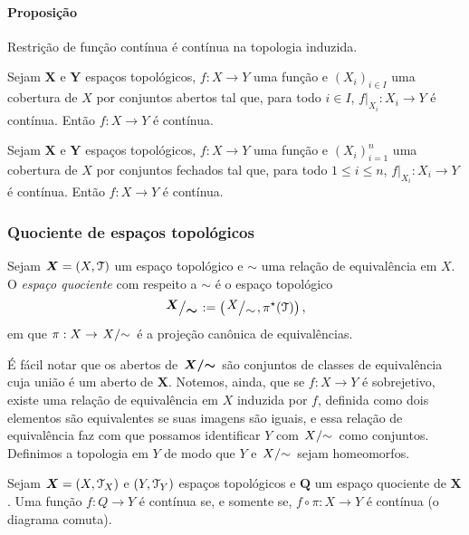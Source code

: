 \paragraph*{Proposição} Restrição de função contínua é contínua na topologia induzida.

\begin{proposition}
Sejam $\bm X$ e $\bm Y$ espaços topológicos, $f: X \to Y$ uma função e $(X_i)_{i \in I}$ uma cobertura de $X$ por conjuntos abertos tal que, para todo $i \in I$, $f|_{X_i}: X_i \to Y$ é contínua. Então $f: X \to Y$ é contínua.
\end{proposition}

\begin{proposition}
Sejam $\bm X$ e $\bm Y$ espaços topológicos, $f: X \to Y$ uma função e $(X_i)_{i=1}^n$ uma cobertura de $X$ por conjuntos fechados tal que, para todo $1 \leq i \leq n$, $f|_{X_i}: X_i \to Y$ é contínua. Então $f: X \to Y$ é contínua.
\end{proposition}

\subsubsection{Quociente de espaços topológicos}

\begin{definition}
Sejam $\bm X = (X,\mathcal{T})$ um espaço topológico e $\sim$ uma relação de equivalência em $X$. O \emph{espaço quociente} com respeito a $\sim$ é o espaço topológico
	\begin{equation*}
	\bm{\quo{X}{\sim}} := \left( \quo{X}{\sim}, \pi^\star(\topo) \right),
	\end{equation*}
em que $\pi: X \to \quo{X}{\sim}$ é a projeção canônica de equivalências.
\end{definition}

É fácil notar que os abertos de $\bm{\quo{X}{\sim}}$ são conjuntos de classes de equivalência cuja união é um aberto de $\bm X$. Notemos, ainda, que se $f: X \to Y$ é sobrejetivo, existe uma relação de equivalência em $X$ induzida por $f$, definida como dois elementos são equivalentes se suas imagens são iguais, e essa relação de equivalência faz com que possamos identificar $Y$ com $\quo{X}{\sim}$ como conjuntos. Definimos a topologia em $Y$ de modo que $Y$ e $\quo{X}{\sim}$ sejam homeomorfos.

\begin{proposition}
Sejam $\bm X=(X,\mathcal{T}_X)$ e $(Y,\mathcal{T}_Y)$ espaços topológicos e $\bm Q$ um espaço quociente de $\bm X$. Uma função $f: Q \to Y$ é contínua se, e somente se, $f \circ \pi: X \to Y$ é contínua (o diagrama comuta).
\begin{figure}
\centering
{}
\end{figure}
\end{proposition}

